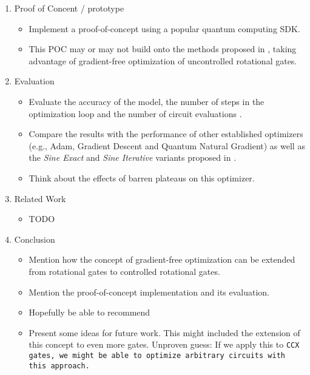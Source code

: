 \begin{enumerate}
    \item Proof of Concent / prototype
    \begin{itemize}
        \item
            Implement a proof-of-concept using a popular quantum computing SDK.
        \item
            This POC may or may not build onto the methods proposed in
            \cite{wendenius_gradient-free_2023}, taking advantage of
            gradient-free optimization of uncontrolled rotational gates.
    \end{itemize}

    \item Evaluation
    \begin{itemize}
        \item
            Evaluate the accuracy of the model, the number of steps in the
            optimization loop and the number of circuit evaluations
            \cite{wendenius_gradient-free_2023}.
        \item
            Compare the results with the performance of other established
            optimizers (e.g., Adam, Gradient Descent and
            Quantum Natural Gradient) as well as the \emph{Sine Exact} and
            \emph{Sine Iterative} variants proposed in
            \cite{wendenius_gradient-free_2023}.
        \item
            Think about the effects of barren plateaus on this optimizer.
    \end{itemize}

    \item Related Work
    \begin{itemize}
        \item TODO
    \end{itemize}

    \item Conclusion
    \begin{itemize}
        \item
            Mention how the concept of gradient-free optimization can be
            extended from rotational gates to controlled rotational gates.
        \item
            Mention the proof-of-concept implementation and its evaluation.
        \item
            Hopefully be able to recommend 
        \item
            Present some ideas for future work.
            This might included the extension of this concept to even more
            gates.
            Unproven guess:
            If we apply this to \tt{CCX} gates, we might be able to optimize
            arbitrary circuits with this approach.
    \end{itemize}


\end{enumerate}
